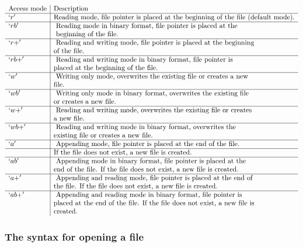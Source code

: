 \documentclass[11pt]{article}
\begin{document}
$$
\begin{array}{l|l}
\text{Access mode}&\text{Description}\\
\hline
`r' & \text{Reading mode, file pointer is placed at the beginning of the file
(default mode).} \\ \hline
`rb' &\text{ Reading mode in binary format, file pointer is placed at the}\\ 
&\text{ beginning of the file. }\\ \hline
`r+' &\text{ Reading and writing mode, file pointer is placed at the beginning}\\ 
&\text{of the file. }\\ \hline
`rb+' &\text{ Reading and writing mode in binary format, file pointer is}\\ 
&\text{placed at the beginning of the file. }\\ \hline
`w' &\text{ Writing only mode, overwrites the existing file or creates a new}\\ 
&\text{file. }\\ \hline
`wb' &\text{ Writing only mode in binary format, overwrites the existing file}\\ 
&\text{or creates a new file. }\\ \hline
`w+' &\text{ Reading and writing mode, overwrites the existing file or creates}\\ 
&\text{a new file. }\\ \hline
`wb+' &\text{ Reading and writing mode in binary format, overwrites the}\\ 
&\text{existing file or creates a new file. }\\ \hline
`a' &\text{ Appending mode, file pointer is placed at the end of the file.}\\ \hline 
&\text{If the file does not exist, a new file is created. }\\ \hline
`ab' &\text{ Appending mode in binary format, file pointer is placed at the}\\ 
&\text{end of the file. If the file does not exist, a new file is created. }\\ \hline
`a+' &\text{ Appending and reading mode, file pointer is placed at the end of}\\ 
&\text{the file. If the file does not exist, a new file is created. }\\ \hline
`ab+' &\text{ Appending and reading mode in binary format, file pointer is}\\ 
&\text{placed at the end of the file. If the file does not exist, a new file is}\\ 
&\text{created. }\\
\end{array}
$$
\hypertarget{the-syntax-for-opening-a-file}{%
\subsubsection{The syntax for opening a
file}\label{the-syntax-for-opening-a-file}}
\end{document}
